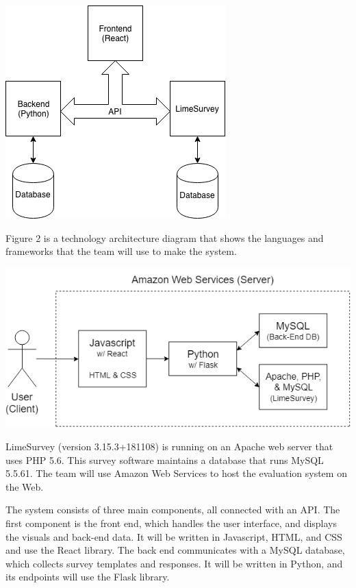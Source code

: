 \documentclass{article}
\begin{document}
\begin{center}
\vspace{1mm}
\label{fig:componentdiagram}
{\includegraphics[scale=.7]{images/component_diagram.png}} 
\end{center}

\vspace{3mm}

Figure 2 is a technology architecture diagram that shows the languages and frameworks that the team will use to make the system.

\begin{center}
\label{fig:technologydiagram}
{\includegraphics[scale=.6]{images/technology_architecture_diagram.png}} 
\end{center}

LimeSurvey (version 3.15.3+181108) is running on an Apache web server that uses PHP 5.6. This survey software maintains a database that runs MySQL 5.5.61. The team will use Amazon Web Services to host the evaluation system on the Web.

The system consists of three main components, all connected with an API. The first component is the front end, which handles the user interface, and displays the visuals and back-end data. It will be written in Javascript, HTML, and CSS and use the React library. The back end communicates with a MySQL database, which collects survey templates and responses. It will be written in Python, and its endpoints will use the Flask library.
\end{document}
